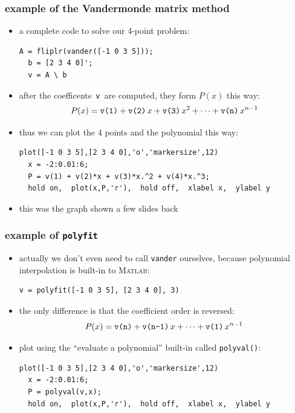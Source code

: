 \documentclass[10pt,hyperref]{beamer}
\newcommand{\Matlab}{\textsc{Matlab}\xspace}
\newcommand{\MO}{\Matlab}
\begin{document}
\begin{frame}[fragile]
\frametitle{example of the Vandermonde matrix method}

\begin{itemize}
\item a complete code to solve our 4-point problem:

\bigskip
\begin{Verbatim}[frame=single,fontfamily=courier,fontsize=\scriptsize]
  A = fliplr(vander([-1 0 3 5]));
  b = [2 3 4 0]';
  v = A \ b
\end{Verbatim}
\bigskip

\item after the coefficents\, \texttt{v}\, are computed, they form $P(x)$ this way:
	$$P(x) = \text{\texttt{v(1)}} + \text{\texttt{v(2)}}\, x + \text{\texttt{v(3)}}\, x^2 + \dots + \text{\texttt{v(n)}}\, x^{n-1}$$

\item thus we can plot the 4 points and the polynomial this way:
\bigskip
\begin{Verbatim}[frame=single,fontfamily=courier,fontsize=\scriptsize]
  plot([-1 0 3 5],[2 3 4 0],'o','markersize',12)
  x = -2:0.01:6;
  P = v(1) + v(2)*x + v(3)*x.^2 + v(4)*x.^3;
  hold on,  plot(x,P,'r'),  hold off,  xlabel x,  ylabel y
\end{Verbatim}
\bigskip

\item this was the graph shown a few slides back
\end{itemize}
\end{frame}


\begin{frame}[fragile]
\frametitle{example of \texttt{polyfit}}

\begin{itemize}
\item actually we don't even need to call \texttt{vander} ourselves, because polynomial interpolation is built-in to \MO:

\bigskip
\begin{Verbatim}[frame=single,fontfamily=courier,fontsize=\scriptsize]
  v = polyfit([-1 0 3 5], [2 3 4 0], 3)
\end{Verbatim}
\bigskip

\item the only difference is that the coefficient order is reversed:
	$$P(x) = \text{\texttt{v(n)}} + \text{\texttt{v(n-1)}}\, x + \dots + \text{\texttt{v(1)}}\, x^{n-1}$$

\item plot using the ``evaluate a polynomial'' built-in called \texttt{polyval()}:

\bigskip
\begin{Verbatim}[frame=single,fontfamily=courier,fontsize=\scriptsize]
  plot([-1 0 3 5],[2 3 4 0],'o','markersize',12)
  x = -2:0.01:6;
  P = polyval(v,x);
  hold on,  plot(x,P,'r'),  hold off,  xlabel x,  ylabel y
\end{Verbatim}
\bigskip
\end{itemize}
\end{frame}
\end{document}
